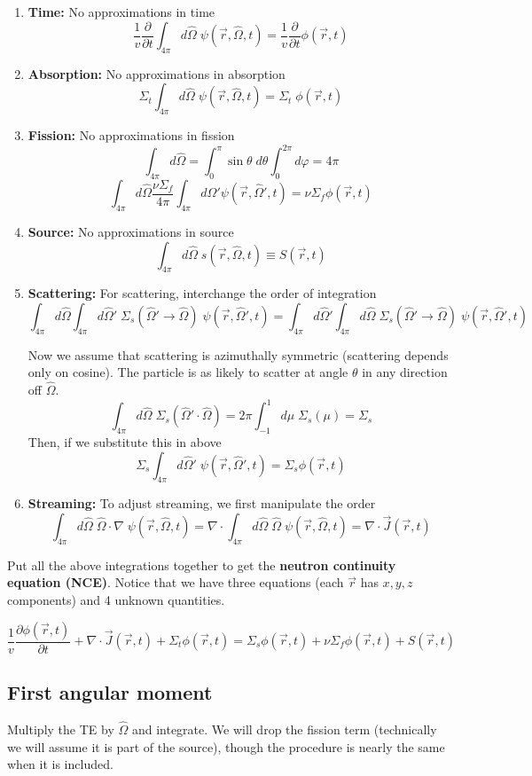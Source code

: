 \documentclass{report}
\newcommand{\hh}[1]{\subsection*{#1}}
\newcommand{\p}{\partial}
\newcommand{\ppt}{\frac{\p}{\p t}}
\newcommand{\Xs}{\Sigma}
\newcommand{\Oov}{\frac{1}{v}}
\newcommand{\pos}{\vec{r}}
\newcommand{\cur}{\vec{J}}
\newcommand{\Oh}{\hat{\Omega}}
\newcommand{\intfp}{\int_{4\pi}}
\newcommand{\rt}{(\pos,t)}
\newcommand{\rOt}{(\pos,\Oh,t)}
\newcommand{\rOtprime}{(\pos,\Oh',t)}
\begin{document}
\begin{enumerate}
    \item \textbf{Time:} No approximations in time
$$ \Oov \ppt \intfp d\Oh \; \psi\rOt = \Oov \ppt \phi\rt $$

    \item \textbf{Absorption:} No approximations in absorption
$$\Xs_t \intfp d\Oh \; \psi\rOt = \Xs_t \; \phi\rt$$

    \item \textbf{Fission:} No approximations in fission
$$ \intfp d\Oh = \int_0^{\pi}\sin\theta \; d\theta \int_0^{2\pi} d\varphi = 4\pi$$
$$\intfp d\Oh \frac{\nu \Xs_f}{4\pi} \intfp d\Oh'\psi\rOtprime = \nu \Xs_f \phi\rt$$

    \item \textbf{Source:} No approximations in source 
$$\intfp d\Oh \; s\rOt \equiv S\rt$$

    \item \textbf{Scattering:} For scattering, interchange the order of integration
    $$ \intfp d\Oh \intfp d\Oh' \; \Xs_s(\Oh'\rightarrow \Oh) \; \psi\rOtprime = \intfp d\Oh' \intfp d\Oh \; \Xs_s(\Oh'\rightarrow\Oh) \; \psi\rOtprime$$

Now we assume that scattering is azimuthally symmetric (scattering depends only on cosine). The particle is as likely to scatter at angle $\theta$ in any direction off $ \Oh$.
    $$\intfp d\Oh \;\Xs_s(\Oh'\cdot\Oh) = 2\pi \int_{-1}^1 d\mu \; \Xs_s(\mu) = \Xs_s$$
Then, if we substitute this in above
    $$\Xs_s \intfp d\Oh' \; \psi\rOtprime =  \Xs_s \phi\rt$$

    \item \textbf{Streaming:} To adjust streaming, we first manipulate the order
$$ \intfp d\Oh \; \Oh \cdot \nabla \; \psi\rOt = \nabla \cdot \intfp d\Oh \; \Oh \; \psi\rOt = \nabla \cdot \cur\rt$$
\end{enumerate}

Put all the above integrations together to get the \textbf{neutron continuity equation (NCE)}. Notice that we have three equations (each $\pos$ has $x,y,z$ components) and 4 unknown quantities.

$$ \Oov \frac{\p \phi\rt}{\p t} + \nabla \cdot \cur\rt + \Xs_t \phi\rt = \Xs_s \phi\rt + \nu \Xs_f \phi\rt + S\rt $$


\hh{First angular moment}
Multiply the TE by $\Oh$ and integrate.  We will drop the fission term (technically we will assume it is part of the source), though the procedure is nearly the same when it is included.
\end{document}
